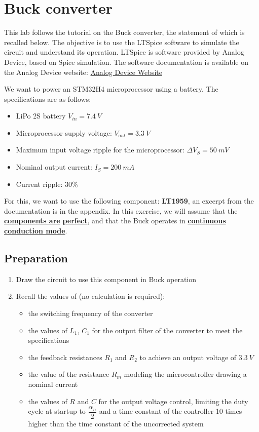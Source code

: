 \chapter{Buck converter}
This lab follows the tutorial on the Buck converter, the statement of which is recalled below.
The objective is to use the LTSpice software to simulate the circuit and understand its operation.
LTSpice is software provided by Analog Device, based on Spice simulation. The software documentation is available on the Analog Device website: \href{https://www.analog.com/en/resources/design-tools-and-calculators/ltspice-simulator/ltspice-recommended-reading-list.html}{Analog Device Website}

We want to power an STM32H4 microprocessor using a battery. The specifications are as follows:

\begin{itemize}
\item LiPo 2S battery $V_{in} = 7.4\ V$
\item Microprocessor supply voltage: $V_{out}=3.3\ V$
\item Maximum input voltage ripple for the microprocessor: $\Delta V_S = 50\ mV$
\item Nominal output current: $I_S = 200\ mA$
\item Current ripple: 30\%
\end{itemize}

For this, we want to use the following component: \textbf{LT1959}, an excerpt from the documentation is in the appendix.
In this exercise, we will assume that the \underline{\textbf{components are}} \underline{\textbf{perfect}}, and that the Buck operates in \underline{\textbf{continuous conduction mode}}.

\section{Preparation}

\begin{enumerate}
\item Draw the circuit to use this component in Buck operation
\item Recall the values of (no calculation is required):
\begin{itemize}
    \item the switching frequency of the converter
    \item the values of $L_1$, $C_1$ for the output filter of the converter to meet the specifications
    \item the feedback resistances $R_1$ and $R_2$ to achieve an output voltage of $3.3\ V$
    \item the value of the resistance $R_m$ modeling the microcontroller drawing a nominal current
    \item the values of $R$ and $C$ for the output voltage control, limiting the duty cycle at startup to $\dfrac{\alpha_n}{2}$ and a time constant of the controller 10 times higher than the time constant of the uncorrected system
\end{itemize}
\end{enumerate}

